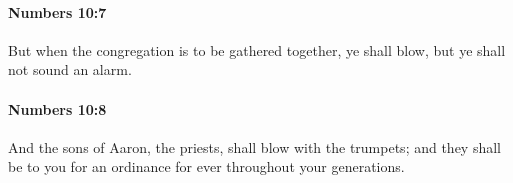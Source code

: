 		\paragraph{Numbers 10:7} %
			\label{NUMBERS-10-7}

			But when the congregation is to be gathered together, ye shall blow, but ye shall not sound an alarm.


		\paragraph{Numbers 10:8} %
			\label{NUMBERS-10-8}

			And the sons of Aaron, the priests, shall blow with the trumpets; and they shall be to you for an ordinance for ever throughout your generations.


